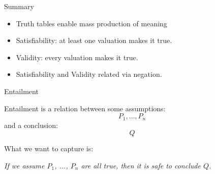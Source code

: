 \documentclass[xetex,aspectratio=169,14pt,hyperref={pdfpagelabels=true,pdflang={en-GB}}]{beamer}
\begin{document}


\begin{frame}
  {Summary}

  \begin{itemize}
  \item Truth tables enable mass production of meaning
  \item Satisfiability: at least one valuation makes it true.
  \item Validity: every valuation makes it true.
  \item Satisfiability and Validity related via negation.
  \end{itemize}
\end{frame}


\begin{frame}
  {Entailment}

  Entailment is a relation between some assumptions:
  \begin{displaymath}
    P_1, \dots, P_n
  \end{displaymath}
  and a conclusion:
  \begin{displaymath}
    Q
  \end{displaymath}

  \pause
  \bigskip

  What we want to capture is:

  \medskip

  \qquad \emph{If we assume $P_1$, ..., $P_n$ are all true, then it is safe to conclude $Q$.}


\end{frame}
\end{document}
